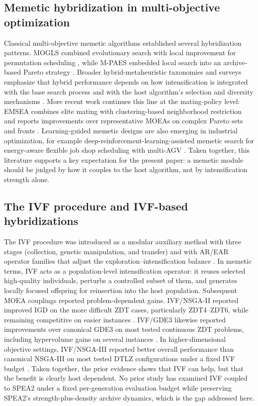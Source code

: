 \documentclass[pdflatex,sn-mathphys-ay]{sn-jnl}%
\theoremstyle{thmstyleone}%
\theoremstyle{thmstyletwo}%
\theoremstyle{thmstylethree}%
\begin{document}
\subsection{Memetic hybridization in multi-objective optimization}\label{subsec:rw-memetic}
Classical multi-objective memetic algorithms established several hybridization patterns. MOGLS combined evolutionary search with local improvement for permutation scheduling \citep{ishibuchi1998multi}, while M-PAES embedded local search into an archive-based Pareto strategy \citep{knowles2000memetic}. Broader hybrid-metaheuristic taxonomies and surveys emphasize that hybrid performance depends on how intensification is integrated with the base search process and with the host algorithm's selection and diversity mechanisms \citep{talbi2002taxonomy, blum2011hybrid}. More recent work continues this line at the mating-policy level: EMSEA combines elite mating with clustering-based neighborhood restriction and reports improvements over representative MOEAs on complex Pareto sets and fronts \citep{Lu2025}. Learning-guided memetic designs are also emerging in industrial optimization, for example deep-reinforcement-learning-assisted memetic search for energy-aware flexible job shop scheduling with multi-AGV \citep{ZhangLiGong2024DRLMA}. Taken together, this literature supports a key expectation for the present paper: a memetic module should be judged by how it couples to the host algorithm, not by intensification strength alone.

\subsection{The IVF procedure and IVF-based hybridizations}\label{subsec:rw-ivf}
The IVF procedure was introduced as a modular auxiliary method with three stages (collection, genetic manipulation, and transfer) and with AR/EAR operator families that adjust the exploration--intensification balance \citep{camilo-junior2011}. In memetic terms, IVF acts as a population-level intensification operator: it reuses selected high-quality individuals, perturbs a controlled subset of them, and generates locally focused offspring for reinsertion into the host population. Subsequent MOEA couplings reported problem-dependent gains. IVF/NSGA-II reported improved IGD on the more difficult ZDT cases, particularly ZDT4--ZDT6, while remaining competitive on easier instances \citep{sampaio2017ivf}. IVF/GDE3 likewise reported improvements over canonical GDE3 on most tested continuous ZDT problems, including hypervolume gains on several instances \citep{sampaio2019ivf}. In higher-dimensional objective settings, IVF/NSGA-III reported better overall performance than canonical NSGA-III on most tested DTLZ configurations under a fixed IVF budget \citep{Sampaio2024}. Taken together, the prior evidence shows that IVF can help, but that the benefit is clearly host dependent. No prior study has examined IVF coupled to SPEA2 under a fixed per-generation evaluation budget while preserving SPEA2's strength-plus-density archive dynamics, which is the gap addressed here.
\end{document}
